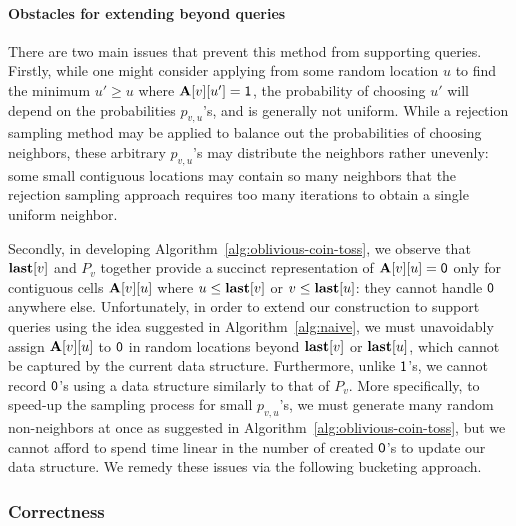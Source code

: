 \paragraph*{Obstacles for extending beyond  queries}
There are two main issues that prevent this method from supporting  queries. Firstly, while one might consider applying  from some random location $u$ to find the minimum $u' \geq u$ where $\mathbf{A}[v][u']=\mathsf{1}$, the probability of choosing $u'$ will depend on the probabilities $p_{v,u}$'s, and is generally not uniform. While a rejection sampling method may be applied to balance out the probabilities of choosing neighbors, these arbitrary $p_{v,u}$'s may distribute the neighbors rather unevenly: some small contiguous locations may contain so many neighbors that the rejection sampling approach requires too many iterations to obtain a single uniform neighbor.

 Secondly, in developing Algorithm~\ref{alg:oblivious-coin-toss}, we observe that $\mathbf{last}[v]$ and $P_v$ together provide a succinct representation of $\mathbf{A}[v][u] = \mathsf{0}$ only for contiguous cells $\mathbf{A}[v][u]$ where $u \leq \mathbf{last}[v]$ or $v \leq \mathbf{last}[u]$: they cannot handle $\mathsf{0}$ anywhere else. Unfortunately, in order to extend our construction to support  queries using the idea suggested in Algorithm~\ref{alg:naive}, we must unavoidably assign $\mathbf{A}[v][u]$ to $\mathsf{0}$ in random locations beyond $\mathbf{last}[v]$ or $\mathbf{last}[u]$, which cannot be captured by the current data structure. Furthermore, unlike $\mathsf{1}$'s, we cannot record $\mathsf{0}$'s using a data structure similarly to that of $P_v$. More specifically, to speed-up the sampling process for small $p_{v,u}$'s, we must generate many random non-neighbors at once as suggested in Algorithm~\ref{alg:oblivious-coin-toss}, but we cannot afford to spend time linear in the number of created $\mathsf{0}$'s to update our data structure. We remedy these issues via the following bucketing approach.

\iffalse
\subsubsection{Correctness}


